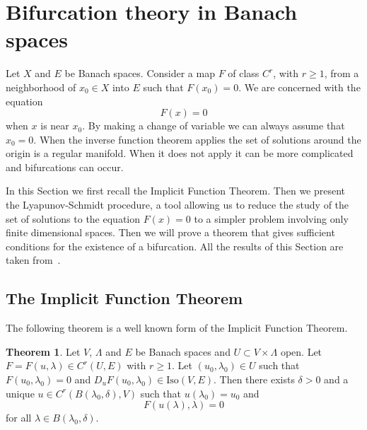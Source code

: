 \documentclass[a4paper,11pt]{article}
\theoremstyle{definition}
\newtheorem{thm}[prop]{Theorem}
\begin{document}
\section{Bifurcation theory in Banach spaces}

Let $X$ and $E$ be Banach spaces. Consider a map $F$ of class $C^r$, with $r\ge1$, from a neighborhood of $x_0\in X$ into $E$ such that $F(x_0)=0$. We are concerned with the equation
\[
F(x)=0
\]
when $x$ is near $x_0$. By making a change of variable we can always assume that $x_0=0$. When the inverse function theorem applies the set of solutions around the origin is a regular manifold. When it does not apply it can be more complicated and bifurcations can occur.

In this Section we first recall the Implicit Function Theorem. Then we present the Lyapunov-Schmidt procedure, a tool allowing us to reduce the study of the set of solutions to the equation $F(x)=0$ to a simpler problem involving only finite dimensional spaces. Then we will prove a theorem that gives sufficient conditions for the existence of a bifurcation. All the results of this Section are taken from~\cite{niremberg}.

\subsection{The Implicit Function Theorem}

The following theorem is a well known form of the Implicit Function Theorem.
\begin{thm}
\label{thm:IFT}
Let $V$, $\Lambda$ and $E$ be Banach spaces and $U\subset V\times\Lambda$ open. Let $F=F(u,\lambda)\in C^r(U,E)$ with $r\ge1$. Let $(u_0,\lambda_0)\in U$ such that $F(u_0,\lambda_0)=0$ and $D_uF(u_0,\lambda_0)\in\text{Iso}(V,E)$. Then there exists $\delta>0$ and a unique $u\in C^r(B(\lambda_0,\delta),V)$ such that $u(\lambda_0)=u_0$ and
\[
F(u(\lambda),\lambda)=0
\]
for all $\lambda\in B(\lambda_0,\delta)$.
\end{thm}
\end{document}
